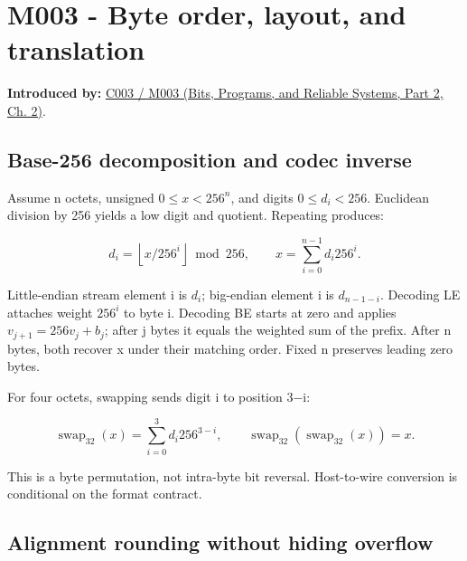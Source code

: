 \section{M003 - Byte order, layout, and translation}\label{03-visual-computing-i-ch018-m003---byte-order-layout-and-translation}

\hypertarget{03-visual-computing-i-ch018-m003---byte-order-layout-and-translation}{}

\textbf{Introduced by:} \href{../01-Bits-Programs-and-Reliable-Systems-P02/main.pdf\#nameddest=01-foundations-i-ch002-where-the-bytes-live}{C003 / M003 (Bits, Programs, and Reliable Systems, Part 2, Ch. 2)}.

\subsection{Base-256 decomposition and codec inverse}\label{03-visual-computing-i-ch018-base-256-decomposition-and-codec-inverse}

\hypertarget{03-visual-computing-i-ch018-base-256-decomposition-and-codec-inverse}{}

Assume n octets, unsigned \(0\le x<256^n\), and digits \(0\le d_i<256\). Euclidean division by 256 yields a low digit and quotient. Repeating produces:

\[
d_i=\left\lfloor x/256^i\right\rfloor\bmod256,\qquad
x=\sum_{i=0}^{n-1}d_i256^i.
\]

Little-endian stream element i is \(d_i\); big-endian element i is \(d_{n-1-i}\). Decoding LE attaches weight \(256^i\) to byte i. Decoding BE starts at zero and applies \(v_{j+1}=256v_j+b_j\); after j bytes it equals the weighted sum of the prefix. After n bytes, both recover x under their matching order. Fixed n preserves leading zero bytes.

For four octets, swapping sends digit i to position 3−i:

\[
\operatorname{swap}_{32}(x)=\sum_{i=0}^{3}d_i256^{3-i},\qquad
\operatorname{swap}_{32}(\operatorname{swap}_{32}(x))=x.
\]

This is a byte permutation, not intra-byte bit reversal. Host-to-wire conversion is conditional on the format contract.

\subsection{Alignment rounding without hiding overflow}\label{03-visual-computing-i-ch018-alignment-rounding-without-hiding-overflow}

